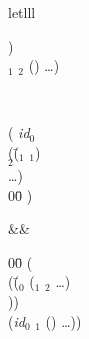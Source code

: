 \begin{optDefinition}
\begin{RewriteTable}{let}{lll}
\begin{minipage}[t]{\columnwidth}
\begin{tabbing}
    \>\>) \\
    \>$_1$ $_2$ () \ldots) \\
\end{tabbing}
\end{minipage}\\
\begin{minipage}[t]{\columnwidth}
\begin{tabbing}
    ( \={\em id$_0$}\\
    \>(\=($_1$ $_1$) \\
    \>\>$_2$ \\
    \>\>\ldots)\\
    00\= \kill
    \>)
\end{tabbing}
\end{minipage}
&\rewrite&
\begin{minipage}[t]{\columnwidth}
\begin{tabbing}
    00\= \kill
    (\\
    \>(\=($_0$ ($_1$ $_2$ \ldots) \\
    \>\>)) \\
    \>({\em id$_0$} $_1$ () \ldots))
\end{tabbing}%
\end{minipage}%
\end{RewriteTable}


\end{optDefinition}
